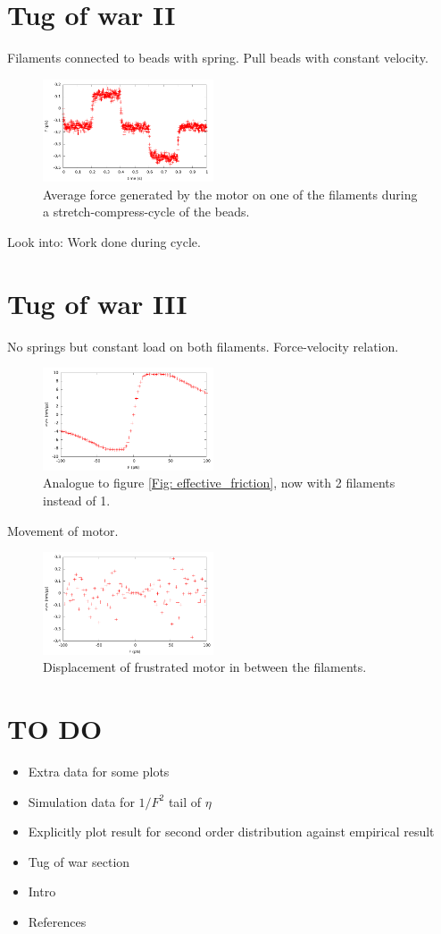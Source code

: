 \documentclass[aps,pre,twocolumn,showpacs,showkeys,a4paper]{revtex4}
\begin{document}
\section{Tug of war II}

Filaments connected to beads with spring. 
Pull beads with constant velocity.
\begin{figure}[t]
\centering
\includegraphics[width=0.45\textwidth,height=!]{tug_v}
\caption{Average force generated by the motor on one of the filaments during a stretch-compress-cycle of the beads.}
\label{Fig: tug_v}
\end{figure}
Look into: Work done during cycle.
\section{Tug of war III}

No springs but constant load on both filaments.\newline
Force-velocity relation.\newline
\begin{figure}[b]
\centering
\includegraphics[width=0.45\textwidth,height=!]{tug_F}
\caption{Analogue to figure \ref{Fig: effective_friction}, now with 2 filaments instead of 1.}
\label{Fig: tug_F}
\end{figure}
Movement of motor.
\begin{figure}[b]
\centering
\includegraphics[width=0.45\textwidth,height=!]{tug_F_motor}
\caption{Displacement of frustrated motor in between the filaments.}
\label{Fig: tug_F_motor}
\end{figure}

\newpage
\section{TO DO}
\begin{itemize}
\item Extra data for some plots
\item Simulation data for $1/F^2$ tail of $\eta$
\item Explicitly plot result for second order distribution against empirical result
\item Tug of war section
\item Intro
\item References
\end{itemize}



\end{document}

